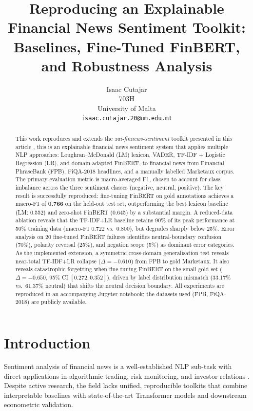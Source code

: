 \documentclass[11pt]{article}
\title{Reproducing an Explainable Financial News Sentiment Toolkit:\\
        Baselines, Fine-Tuned FinBERT, and Robustness Analysis}
\author{
  Isaac Cutajar \\
  703H \\
  University of Malta \\
  \texttt{isaac.cutajar.20@um.edu.mt}
}
\date{}
\begin{document}
\maketitle

\begin{abstract}
This work reproduces and extends the \textit{xai-finnews-sentiment} toolkit presented in this article
\cite{xai_finnews_2025}, this is an explainable financial news sentiment system that
applies multiple NLP approaches: Loughran–McDonald (LM) lexicon, VADER,
TF-IDF + Logistic Regression (LR), and domain-adapted FinBERT, to
financial news from Financial PhraseBank (FPB), FiQA-2018 headlines, and a
manually labelled Marketaux corpus. The primary evaluation metric is
macro-averaged F1, chosen to account for class imbalance across the three
sentiment classes (negative, neutral, positive). The key result is successfully
reproduced: fine-tuning FinBERT \cite{araci2019finbert} on gold annotations
achieves a macro-F1 of \textbf{0.766} on the held-out test set, outperforming
the best lexicon baseline (LM: 0.552) and zero-shot FinBERT (0.645) by a
substantial margin. A reduced-data ablation reveals that the TF-IDF+LR
baseline retains 90\% of its peak performance at 50\% training data
(macro-F1 0.722 vs.\ 0.800), but degrades sharply below 25\%. Error analysis
on 20 fine-tuned FinBERT failures identifies neutral-boundary confusion (70\%),
polarity reversal (25\%), and negation scope (5\%) as dominant error categories.
As the implemented extension, a symmetric cross-domain generalisation test
reveals near-total TF-IDF+LR collapse ($\Delta=-0.610$) from FPB to gold
Marketaux. It also reveals catastrophic forgetting when fine-tuning FinBERT on
the small gold set ($\Delta=-0.650$, 95\% CI $[0.272, 0.352]$), driven by
label distribution mismatch (33.17\% vs.\ 61.37\% neutral) that shifts the
neutral decision boundary. All experiments are reproduced in an accompanying Jupyter
notebook; the datasets used (FPB, FiQA-2018) are publicly available.
\end{abstract}

\section{Introduction}
\label{sec:intro}

Sentiment analysis of financial news is a well-established NLP sub-task with
direct applications in algorithmic trading, risk monitoring, and investor
relations \cite{malo2014good,maia2018fiqa18}. Despite active research, the
field lacks unified, reproducible toolkits that combine interpretable
baselines with state-of-the-art Transformer models and downstream econometric
validation.
\end{document}
